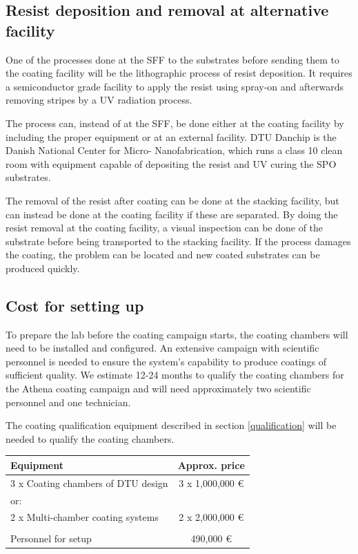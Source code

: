 \subsection{Resist deposition and removal at alternative facility}
One of the processes done at the SFF to the substrates before sending them to the coating facility will be the lithographic process of resist deposition. It requires a semiconductor grade facility to apply the resist using spray-on and afterwards removing stripes by a UV radiation process.

The process can, instead of at the SFF, be done either at the coating facility by including the proper equipment or at an external facility. DTU Danchip is the Danish National Center for Micro- Nanofabrication, which runs a class 10 clean room with equipment capable of depositing the resist and UV curing the SPO substrates.

The removal of the resist after coating can be done at the stacking facility, but can instead be done at the coating facility if these are separated. By doing the resist removal at the coating facility, a visual inspection can be done of the substrate before being transported to the stacking facility. If the process damages the coating, the problem can be located and new coated substrates can be produced quickly.


\subsection{Cost for setting up}
To prepare the lab before the coating campaign starts, the coating chambers will need to be installed and configured. An extensive campaign with scientific personnel is needed to ensure the system's capability to produce coatings of sufficient quality. We estimate 12-24 months to qualify the coating chambers for the Athena coating campaign and will need approximately two scientific personnel and one technician.

The coating qualification equipment described in section \ref{qualification} will be needed to qualify the coating chambers.


\begin{table}[htbp]
	\centering
\begin{tabular}{l|c}
Equipment & Approx. price \\
\hline
\hline
3 x Coating chambers of DTU design  & 3 x 1,000,000 \euro\\
\hline
or:\\
\hline
2 x Multi-chamber coating systems & 2 x 2,000,000 \euro \\
\hline
\\
\hline
Personnel for setup & 490,000 \euro\\
\end{tabular}
\end{table}


